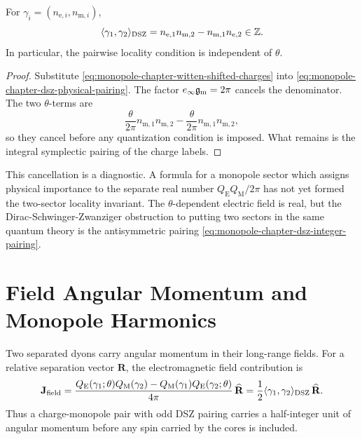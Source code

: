 \begin{proposition}
\label{prop:monopole-chapter-dsz-pairing}
For \(\gamma_i=(n_{\mathrm e,i},n_{\mathrm m,i})\),
\begin{equation}
  \langle\gamma_1,\gamma_2\rangle_{\rm DSZ}
  =
  n_{\mathrm e,1}n_{\mathrm m,2}
  -
  n_{\mathrm m,1}n_{\mathrm e,2}
  \in\mathbb Z .
  \label{eq:monopole-chapter-dsz-integer-pairing}
\end{equation}
In particular, the pairwise locality condition is independent of
\(\theta\).
\end{proposition}

\begin{proof}
Substitute \eqref{eq:monopole-chapter-witten-shifted-charges} into
\eqref{eq:monopole-chapter-dsz-physical-pairing}.  The factor
\(e_\infty\mathfrak g_{\rm m}=2\pi\) cancels the denominator.  The two
\(\theta\)-terms are
\[
  \frac{\theta}{2\pi}n_{\mathrm m,1}n_{\mathrm m,2}
  -
  \frac{\theta}{2\pi}n_{\mathrm m,1}n_{\mathrm m,2},
\]
so they cancel before any quantization condition is imposed.  What remains is
the integral symplectic pairing of the charge labels.
\end{proof}

This cancellation is a diagnostic.  A formula for a monopole sector which
assigns physical importance to the separate real number
\(Q_{\mathrm E}Q_{\mathrm M}/2\pi\) has not yet formed the two-sector
locality invariant.  The \(\theta\)-dependent electric field is real, but the
Dirac-Schwinger-Zwanziger obstruction to putting two sectors in the same
quantum theory is the antisymmetric pairing
\eqref{eq:monopole-chapter-dsz-integer-pairing}.

\section{Field Angular Momentum and Monopole Harmonics}
\label{sec:field-angular-momentum-monopole-harmonics}

Two separated dyons carry angular momentum in their long-range fields.  For a
relative separation vector \(\mathbf R\), the electromagnetic field
contribution is
\begin{equation}
  \mathbf J_{\rm field}
  =
  \frac{
    Q_{\mathrm E}(\gamma_1;\theta)Q_{\mathrm M}(\gamma_2)
    -
    Q_{\mathrm M}(\gamma_1)Q_{\mathrm E}(\gamma_2;\theta)
  }{4\pi}\,
  \widehat{\mathbf R}
  =
  \frac12
  \langle\gamma_1,\gamma_2\rangle_{\rm DSZ}\,
  \widehat{\mathbf R}.
  \label{eq:monopole-chapter-field-angular-momentum}
\end{equation}
Thus a charge-monopole pair with odd DSZ pairing carries a half-integer unit
of angular momentum before any spin carried by the cores is included.

